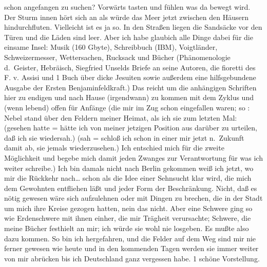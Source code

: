\documentclass[
]{article}
\begin{document}
schon angefangen zu suchen? Vorwärts tasten und fühlen was da bewegt
wird. Der Sturm innen hört sich an als würde das Meer jetzt zwischen den
Häusern hindurchfluten. Vielleicht ist es ja so. In den Straßen liegen
die Sandsäcke vor den Türen und die Läden sind leer. Aber ich habe
glaubich alle Dinge dabei für die einsame Insel: Musik (160 Gbyte),
Schreibbuch (IBM), Voigtländer, Schweizermesser, Wettersachen, Rucksack
und Bücher (Phänomenologie d.~Geister, Hebräisch, Siegfried Unselds
Briefe an seine Autoren, die fioretti des F. v. Assisi und 1 Buch über
dicke Jesuiten sowie außerdem eine hilfsgebundene Ausgabe der Ersten
Benjaminfeldkraft.) Das reicht um die anhängigen Schriften hier zu
endigen und nach Hause (irgendwann) zu kommen mit dem Zyklus und (wenn
lebend) offen für Anfänge (die mir im Zug schon eingefallen waren; so :
Nebel stand über den Feldern meiner Heimat, als ich sie zum letzten Mal:
(gesehen hatte = hätte ich von meiner jetzigen Position aus darüber zu
urteilen, daß ich sie wiedersah.) (sah = schloß ich schon in einer mir
jetzt n.~Zukunft damit ab, sie jemals wiederzusehen.) Ich entschied mich
für die zweite Möglichkeit und begebe mich damit jeden Zwanges zur
Verantwortung für was ich weiter schreibe.) Ich bin damals nicht nach
Berlin gekommen weiß ich jetzt, wo mir die Rückkehr nach\ldots{} schon
als die Idee einer Sehnsucht klar wird, die mich dem Gewohnten
entfliehen läßt und jeder Form der Beschränkung. Nicht, daß es nötig
gewesen wäre sich aufzulehnen oder mit Dingen zu brechen, die in der
Stadt um mich ihre Kreise gezogen hatten, nein das nicht. Aber eine
Schwere ging so wie Erdenschwere mit ihnen einher, die mir Trägheit
verursachte; Schwere, die meine Bücher festhielt an mir; ich würde sie
wohl nie losgeben. Es mußte also dazu kommen. So bin ich hergefahren,
und die Felder auf dem Weg sind mir nie ferner gewesen wie heute und in
den kommenden Tagen werden sie immer weiter von mir abrücken bis ich
Deutschland ganz vergessen habe. 1 schöne Vorstellung.
\end{document}
